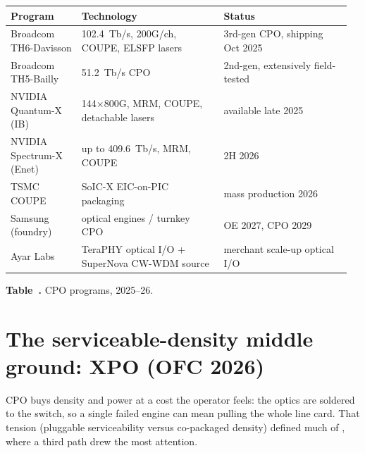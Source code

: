 \begin{table}[ht]
\label{tab:cpo-programs}%
\centering
\setlength{\tabcolsep}{5pt}%
\renewcommand{\arraystretch}{1.25}%
\begin{tabular}{@{}p{0.20\linewidth}p{0.40\linewidth}p{0.36\linewidth}@{}}
\toprule
Program & Technology & Status \\
\midrule
Broadcom TH6-Davisson & 102.4~Tb/s, 200G/ch, COUPE, ELSFP lasers & 3rd-gen CPO, shipping Oct 2025 \\
\addlinespace[1.5em]
Broadcom TH5-Bailly & 51.2~Tb/s CPO & 2nd-gen, extensively field-tested \\
\addlinespace[1.5em]
NVIDIA Quantum-X (IB) & 144$\times$800G, MRM, COUPE, detachable lasers & available late 2025 \\
\addlinespace[1.5em]
NVIDIA Spectrum-X (Enet) & up to 409.6~Tb/s, MRM, COUPE & 2H 2026 \\
\addlinespace[1.5em]
TSMC COUPE & SoIC-X EIC-on-PIC packaging & mass production 2026 \\
\addlinespace[1.5em]
Samsung (foundry) & optical engines / turnkey CPO & OE 2027, CPO 2029 \\
\addlinespace[1.5em]
Ayar Labs & TeraPHY optical I/O + SuperNova CW-WDM source & merchant scale-up optical I/O \\
\bottomrule
\end{tabular}
\par\medskip
{\raggedright\footnotesize\textbf{Table~\thetable.} CPO programs, 2025--26.\par}
\end{table}


\section{The serviceable-density middle ground: XPO (OFC 2026)}
\label{sec:xpo}

CPO buys density and power at a cost the operator feels: the optics are soldered to
the switch, so a single failed engine can mean pulling the whole line card. That
tension (pluggable serviceability versus co-packaged density) defined much of
, where a third path drew the most attention.

